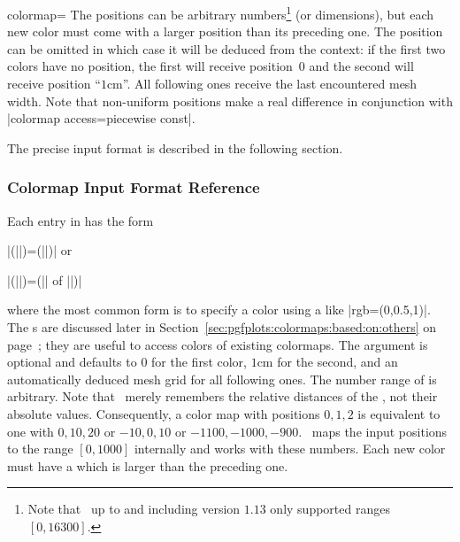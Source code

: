 \begin{pgfplotskey}{colormap=}
	The positions can be arbitrary numbers\footnote{Note that \PGFPlots\ up to and including version $1.13$ only supported ranges $[0,16300]$.} (or dimensions), but each new color must come with a larger position than its preceding one. The position can be omitted in which case it will be deduced from the context: if the first two colors have no position, the first will receive position~$0$ and the second will receive position ``$1\text{cm}$''. All following ones receive the last encountered mesh width. Note that non-uniform positions make a real difference in conjunction with |colormap access=piecewise const|.

	The precise input format is described in the following section.

\subsubsection{Colormap Input Format Reference}
\label{sec:colormap:input:format}%
Each entry in  has the form 

	|(||)=(||)| or

	|(||)=(|| of ||)|

where the most common form is to specify a color using a  like |rgb=(0,0.5,1)|. The s are discussed later in Section~\ref{sec:pgfplots:colormaps:based:on:others} on page~\pageref{sec:pgfplots:colormaps:based:on:others}; they are useful to access colors of existing colormaps. The  argument is optional and defaults to $0$ for the first color, $1\text{cm}$ for the second, and an automatically deduced mesh grid for all following ones. The number range of  is arbitrary. Note that \PGFPlots\ merely remembers the relative distances of the , not their absolute values. Consequently, a color map with positions $0,1,2$ is equivalent to one with $0,10,20$ or $-10,0,10$ or $-1100,-1000,-900$. \PGFPlots\ maps the input positions to the range $[0,1000]$ internally and works with these numbers. Each new color must have a  which is larger than the preceding one.


\end{pgfplotskey}
